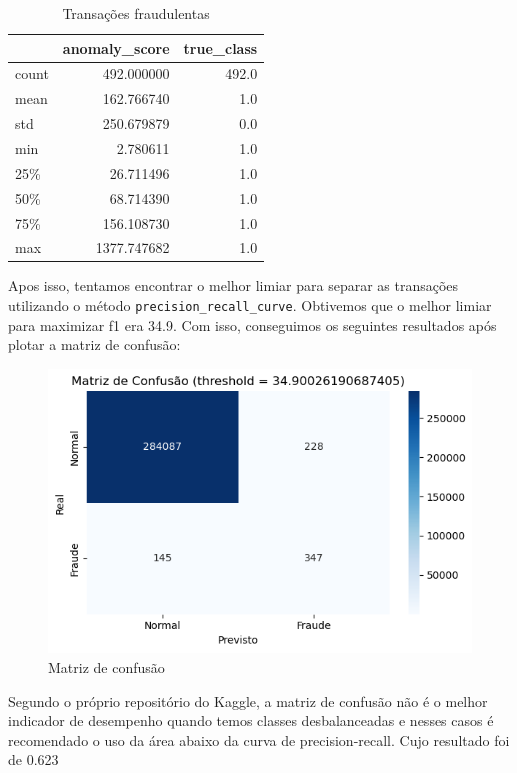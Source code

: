 \documentclass[conference]{IEEEtran}
\begin{document}
\begin{table}[H]
    \caption{Transações fraudulentas}
    \label{tab:score_anomalia_fraude}
    \centering
    \begin{tabular}{lrr}
        \toprule
        & \textbf{anomaly\_score} & \textbf{true\_class} \\
        \midrule
        count & 492.000000 & 492.0 \\
        mean & 162.766740 & 1.0 \\
        std & 250.679879 & 0.0 \\
        min & 2.780611 & 1.0 \\
        25\% & 26.711496 & 1.0 \\
        50\% & 68.714390 & 1.0 \\
        75\% & 156.108730 & 1.0 \\
        max & 1377.747682 & 1.0 \\
        \bottomrule
    \end{tabular}
\end{table}
Apos isso, tentamos encontrar o melhor limiar para separar as transações utilizando o método \texttt{precision\_recall\_curve}. Obtivemos que o melhor limiar para maximizar f1 era 34.9. Com isso, conseguimos os seguintes resultados após plotar a matriz de confusão:
\begin{figure}[H]
    \centerline{\includegraphics[width=0.8\linewidth]{../output/matriz de confusao maximo f1.png}}
    \caption{Matriz de confusão}
    \label{fig:matriz_confusao}
\end{figure}
Segundo o próprio repositório do Kaggle, a matriz de confusão não é o melhor indicador de desempenho quando temos classes desbalanceadas e nesses casos é recomendado o uso da área abaixo da curva de precision-recall. Cujo resultado foi de 0.623
\end{document}
